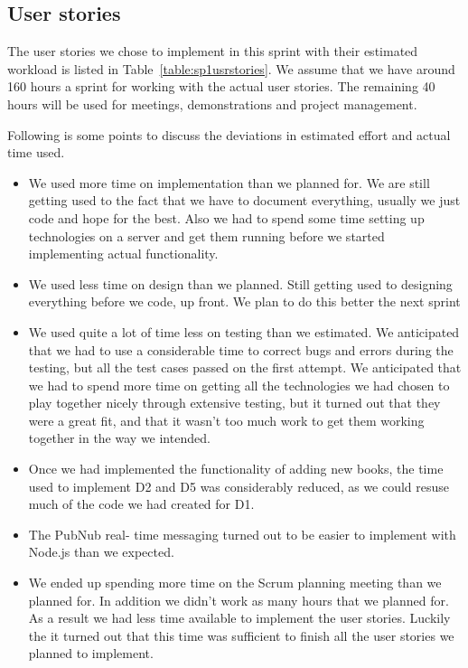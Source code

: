 \subsection{User stories}
The user stories we chose to implement in this sprint with their estimated workload is listed in Table~\ref{table:sp1usrstories}. We assume that we have around 160 hours a sprint for working with the actual user stories. The remaining 40 hours will be used for meetings, demonstrations and project management.

Following is some points to discuss the deviations in estimated effort and actual time used.
\begin{itemize}
\item We used more time on implementation than we planned for. We are still getting used to the fact that we have to document everything, usually we just code and hope for the best. Also we had to spend some time setting up technologies on a server and get them running before we started implementing actual functionality.
\item We used less time on design than we planned. Still getting used to designing everything before we code, up front. We plan to do this better the next sprint
\item We used quite a lot of time less on testing than we estimated. We anticipated that we had to use a considerable time to correct bugs and errors during the testing, but all the test cases passed on the first attempt. We anticipated that we had to spend more time on getting all the technologies we had chosen to play together nicely through extensive testing, but it turned out that they were a great fit, and that it wasn't too much work to get them working together in the way we intended.
\item Once we had implemented the functionality of adding new books, the time used to implement D2 and D5 was considerably reduced, as we could resuse much of the code we had created for D1.
\item The PubNub real- time messaging turned out to be easier to implement with Node.js than we expected. 
\item We ended up spending more time on the Scrum planning meeting than we planned for. In addition we didn't work as many hours that we planned for. As a result we had less time available to implement the user stories. Luckily the it turned out that this time was sufficient to finish all the user stories we planned to implement.
\end{itemize}

